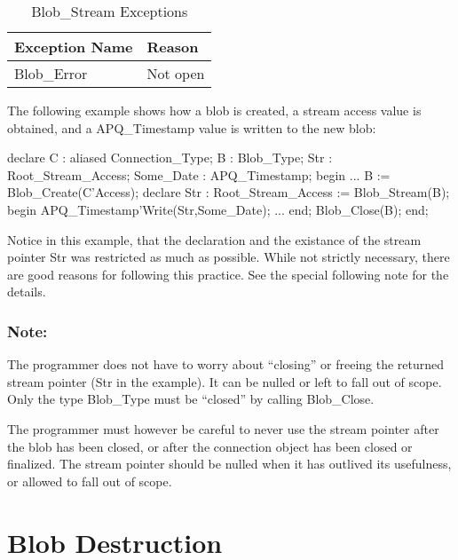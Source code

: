 \documentclass[english,letterpaper]{book}
\begin{document}
\begin{table}
   \begin{center}
      \begin{tabular}{ll}
         Exception Name    &  Reason\\
         \hline 
         Blob\_Error       &  Not open\\
      \end{tabular}
   \end{center}
   \caption{Blob\_Stream Exceptions}\label{t:blbstrx}
\end{table}

The following example shows how a blob is created, a stream access
value is obtained, and a APQ\_Timestamp value is written to the new
blob:

\begin{Example}
declare
   C :         aliased Connection_Type;
   B :         Blob_Type;
   Str :       Root_Stream_Access;
   Some_Date : APQ_Timestamp;
begin
   ...
   B   := Blob_Create(C'Access);
   declare
      Str : Root_Stream_Access := Blob_Stream(B);
   begin
      APQ_Timestamp'Write(Str,Some_Date);
      ...
   end;
   Blob_Close(B);
end;
\end{Example}

Notice in this example, that the declaration and the existance of
the stream pointer Str was restricted as much as possible.
While not strictly necessary, there are good reasons for following
this practice. See the special following note for the details.


\subsubsection{Note:}

The programmer does not have to worry about ``closing'' or freeing
the returned stream pointer (Str in the example). It can be
nulled or left to fall out of scope. Only the type Blob\_Type
must be ``closed'' by calling Blob\_Close.

The programmer must however be careful to never use the stream pointer
after the blob has been closed, or after the connection object has
been closed or finalized. The stream pointer should be nulled when
it has outlived its usefulness, or allowed to fall out of scope.


\section{Blob Destruction}
\end{document}
